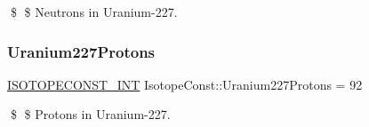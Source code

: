 \$ \$ Neutrons in Uranium-\/227. \mbox{\label{group___isotope_const-_uranium-_u227_ga877e1f0e7dd7cfd56d325d72d1a9c60c}} 
\subsubsection{\texorpdfstring{Uranium227\+Protons}{Uranium227Protons}}
{\footnotesize\ttfamily \mbox{\hyperlink{group___isotope_const-_macros_ga5f18360b3e99483a35c32d789e62621c}{I\+S\+O\+T\+O\+P\+E\+C\+O\+N\+S\+T\+\_\+\+I\+NT}} Isotope\+Const\+::\+Uranium227\+Protons = 92}

\$ \$ Protons in Uranium-\/227. 